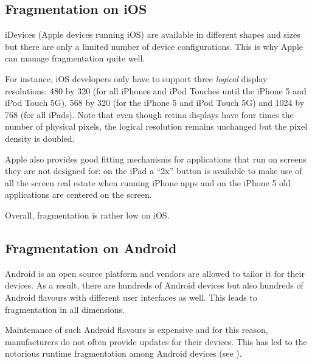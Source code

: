 
\subsection{Fragmentation on iOS}

iDevices (Apple devices running iOS) are available in different shapes and sizes but there are only a limited number of device configurations. This is why Apple can manage fragmentation quite well. 

For instance, iOS developers only have to support three \emph{logical} display resolutions: 480 by 320 (for all iPhones and iPod Touches until the iPhone 5 and iPod Touch 5G), 568 by 320 (for the iPhone 5 and iPod Touch 5G) and 1024 by 768 (for all iPads). Note that even though retina displays have four times the number of physical pixels, the logical resolution remains unchanged but the pixel density is doubled. 

Apple also provides good fitting mechanisms for applications that run on screens they are not designed for: on the iPad a ``2x'' button is available to make use of  all the screen real estate when running iPhone apps and on the iPhone 5 old applications are centered on the screen.


Overall, fragmentation is rather low on iOS.

\subsection{Fragmentation on Android}

Android is an open source platform and vendors are allowed to tailor it for their devices. As a result, there are hundreds of Android devices but also hundreds of Android flavours with different user interfaces as well. This leads to fragmentation in all dimensions.

Maintenance of such Android flavours is expensive and for this reason, manufacturers do not often provide updates for their devices. This has led to the notorious runtime fragmentation among Android devices (see ). 

